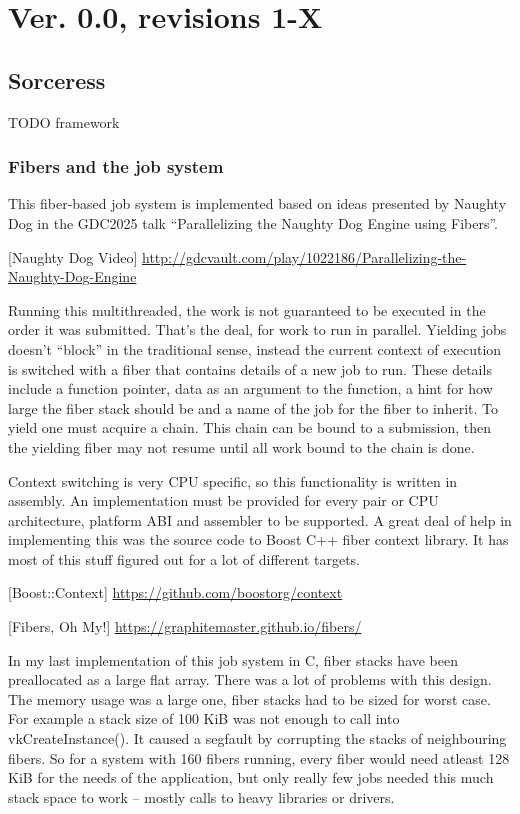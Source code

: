 \section{Ver. 0.0, revisions 1-X}

\subsection{Sorceress}
TODO framework

\subsubsection{Fibers and the job system}
This fiber-based job system is implemented based on ideas presented by Naughty Dog
in the GDC2025 talk ``Parallelizing the Naughty Dog Engine using Fibers''.

[Naughty Dog Video] 
\url{http://gdcvault.com/play/1022186/Parallelizing-the-Naughty-Dog-Engine}

Running this multithreaded, the work is not guaranteed to be executed in the order it was submitted.
That's the deal, for work to run in parallel. 
Yielding jobs doesn't ``block'' in the traditional sense, instead the current context of execution
is switched with a fiber that contains details of a new job to run.
These details include a function pointer, data as an argument to the function, 
a hint for how large the fiber stack should be and a name of the job for the fiber to inherit.
To yield one must acquire a chain. 
This chain can be bound to a submission, then the yielding fiber may not resume until all work bound to the chain is done.

Context switching is very CPU specific, so this functionality is written in assembly.
An implementation must be provided for every pair or CPU architecture, platform ABI and assembler to be supported.
A great deal of help in implementing this was the source code to Boost C++ fiber context library.
It has most of this stuff figured out for a lot of different targets.

[Boost::Context]
\url{https://github.com/boostorg/context}

[Fibers, Oh My!]
\url{https://graphitemaster.github.io/fibers/}

In my last implementation of this job system in C, fiber stacks have been preallocated as a large flat array.
There was a lot of problems with this design. 
The memory usage was a large one, fiber stacks had to be sized for worst case.
For example a stack size of 100 KiB was not enough to call into vkCreateInstance().
It caused a segfault by corrupting the stacks of neighbouring fibers.
So for a system with 160 fibers running, every fiber would need atleast 128 KiB for the needs of the application,
but only really few jobs needed this much stack space to work -- mostly calls to heavy libraries or drivers.

